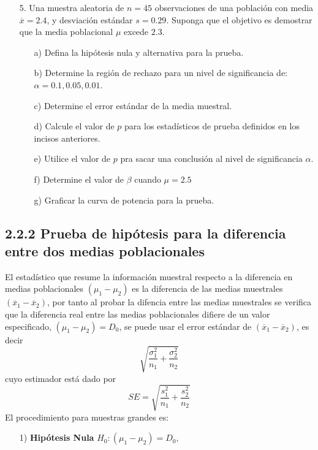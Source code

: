 \begin{frame}
\begin{frame}
\begin{itemize}
\item[5. ] Una muestra aleatoria de $n=45$ observaciones de una poblaci\'on con media $\overline{x}=2.4$, y desviaci\'on est\'andar $s=0.29$. Suponga que el objetivo es demostrar que la media poblacional $\mu$ excede $2.3$.
\begin{itemize}
\item[a) ] Defina la hip\'otesis nula y alternativa para la prueba.
\item[b) ] Determine la regi\'on de rechazo para un nivel de significancia de: $\alpha=0.1,0.05,0.01$.
\item[c) ] Determine el error est\'andar de la media muestral.
\item[d) ] Calcule el valor de $p$ para los estad\'isticos de prueba definidos en los incisos anteriores.
\item[e) ] Utilice el valor de $p$ pra sacar una conclusi\'on al nivel de significancia $\alpha$.
\item[f) ] Determine el valor de $\beta$ cuando $\mu=2.5$
\item[g) ] Graficar la curva de potencia para la prueba.

\end{itemize}
\end{itemize}


\subsection{2.2.2 Prueba de hip\'otesis para la diferencia entre dos medias poblacionales}



El estad\'istico que resume la informaci\'on muestral respecto a la diferencia en medias poblacionales $\left(\mu_{1}-\mu_{2}\right)$ es la diferencia de las medias muestrales $\left(\overline{x}_{1}-\overline{x}_{2}\right)$, por tanto al probar la difencia entre las medias muestrales se verifica que la diferencia real entre las medias poblacionales difiere de un valor especificado, $\left(\mu_{1}-\mu_{2}\right)=D_{0}$, se puede usar el error est\'andar de $\left(\overline{x}_{1}-\overline{x}_{2}\right)$, es decir
$$\sqrt{\frac{\sigma^{2}_{1}}{n_{1}}+\frac{\sigma^{2}_{2}}{n_{2}}}$$
cuyo estimador est\'a dado por
$$SE=\sqrt{\frac{s^{2}_{1}}{n_{1}}+\frac{s^{2}_{2}}{n_{2}}}$$
El procedimiento para muestras grandes es:



\begin{itemize}
\item[1) ] \textbf{Hip\'otesis Nula} $H_{0}:\left(\mu_{1}-\mu_{2}\right)=D_{0}$,\medskip


\end{itemize}
\end{frame}
\end{frame}
